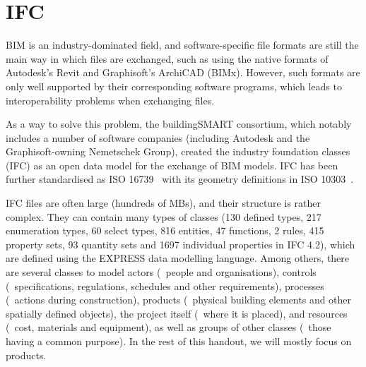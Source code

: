 \section{IFC}

BIM is an industry-dominated field, and software-specific file formats are still the main way in which files are exchanged, such as using the native formats of Autodesk's Revit and Graphisoft's ArchiCAD (BIMx).
However, such formats are only well supported by their corresponding software programs, which leads to interoperability problems when exchanging files.

As a way to solve this problem, the buildingSMART consortium, which notably includes a number of software companies (including Autodesk and the Graphisoft-owning Nemetschek Group), created the industry foundation classes (IFC) as an open data model for the exchange of BIM models.
IFC has been further standardised as ISO 16739~\citep{ISO16739:2013} with its geometry definitions in ISO 10303~\citep{ISO10303:2014}.

IFC files are often large (hundreds of MBs), and their structure is rather complex.
They can contain many types of classes (130 defined types, 217 enumeration types, 60 select types, 816 entities, 47 functions, 2 rules, 415 property sets, 93 quantity sets and 1697 individual properties in IFC 4.2), which are defined using the EXPRESS data modelling language.
Among others, there are several classes to model actors (\eg\ people and organisations), controls (\eg\ specifications, regulations, schedules and other requirements), processes (\eg\ actions during construction), products (\eg\ physical building elements and other spatially defined objects), the project itself (\eg\ where it is placed), and resources (\eg\ cost, materials and equipment), as well as groups of other classes (\eg\ those having a common purpose).
In the rest of this handout, we will mostly focus on products.

